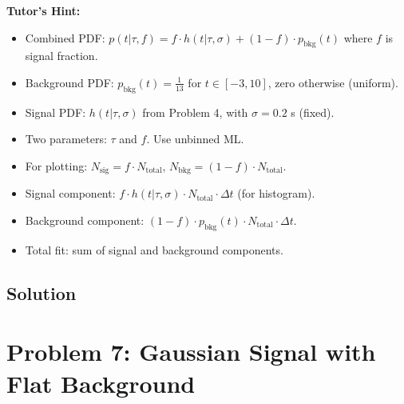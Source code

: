 \documentclass[11pt]{article}
\begin{document}
\textbf{Tutor's Hint:}
\begin{itemize}
    \item Combined PDF: $p(t|\tau, f) = f \cdot h(t|\tau, \sigma) + (1-f) \cdot p_{\text{bkg}}(t)$ where $f$ is signal fraction.
    \item Background PDF: $p_{\text{bkg}}(t) = \frac{1}{13}$ for $t \in [-3, 10]$, zero otherwise (uniform).
    \item Signal PDF: $h(t|\tau, \sigma)$ from Problem 4, with $\sigma = 0.2$ s (fixed).
    \item Two parameters: $\tau$ and $f$. Use unbinned ML.
    \item For plotting: $N_{\text{sig}} = f \cdot N_{\text{total}}$, $N_{\text{bkg}} = (1-f) \cdot N_{\text{total}}$.
    \item Signal component: $f \cdot h(t|\tau, \sigma) \cdot N_{\text{total}} \cdot \Delta t$ (for histogram).
    \item Background component: $(1-f) \cdot p_{\text{bkg}}(t) \cdot N_{\text{total}} \cdot \Delta t$.
    \item Total fit: sum of signal and background components.
\end{itemize}

\subsection{Solution}


\section{Problem 7: Gaussian Signal with Flat Background}
\end{document}
